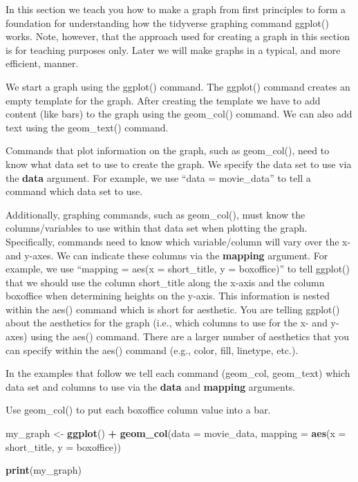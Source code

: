 \documentclass[
]{krantz}
\makeatletter
\newenvironment{Shaded}{\begin{snugshade}}{\end{snugshade}}
\newcommand{\DataTypeTok}[1]{\textcolor[rgb]{0.27,0.27,0.27}{#1}}
\newcommand{\KeywordTok}[1]{\textcolor[rgb]{0.27,0.27,0.27}{\textbf{#1}}}
\newcommand{\NormalTok}[1]{#1}
\newcommand{\OperatorTok}[1]{\textcolor[rgb]{0.43,0.43,0.43}{\textbf{#1}}}
\newcommand{\StringTok}[1]{\textcolor[rgb]{0.5,0.5,0.5}{#1}}
\newenvironment{kframe}{%
\medskip{}
\setlength{\fboxsep}{.8em}
 \def\at@end@of@kframe{}%
 \ifinner\ifhmode%
  \def\at@end@of@kframe{\end{minipage}}%
  \begin{minipage}{\columnwidth}%
 \fi\fi%
 \def\FrameCommand##1{\hskip\@totalleftmargin \hskip-\fboxsep
 \colorbox{shadecolor}{##1}\hskip-\fboxsep
     \hskip-\linewidth \hskip-\@totalleftmargin \hskip\columnwidth}%
 \MakeFramed {\advance\hsize-\width
   \@totalleftmargin\z@ \linewidth\hsize
   \@setminipage}}%
 {\par\unskip\endMakeFramed%
 \at@end@of@kframe}
\renewenvironment{Shaded}{\begin{kframe}}{\end{kframe}}
\makeatother
\begin{document}
In this section we teach you how to make a graph from first principles to form a foundation for understanding how the tidyverse graphing command ggplot() works. Note, however, that the approach used for creating a graph in this section is for teaching purposes only. Later we will make graphs in a typical, and more efficient, manner.

We start a graph using the ggplot() command. The ggplot() command creates an empty template for the graph. After creating the template we have to add content (like bars) to the graph using the geom\_col() command. We can also add text using the geom\_text() command.

Commands that plot information on the graph, such as geom\_col(), need to know what data set to use to create the graph. We specify the data set to use via the \textbf{data} argument. For example, we use ``data = movie\_data'' to tell a command which data set to use.

Additionally, graphing commands, such as geom\_col(), must know the columns/variables to use within that data set when plotting the graph. Specifically, commands need to know which variable/column will vary over the x- and y-axes. We can indicate these columns via the \textbf{mapping} argument. For example, we use ``mapping = aes(x = short\_title, y = boxoffice)'' to tell ggplot() that we should use the column short\_title along the x-axis and the column boxoffice when determining heights on the y-axis. This information is nested within the aes() command which is short for aesthetic. You are telling ggplot() about the aesthetics for the graph (i.e., which columns to use for the x- and y-axes) using the aes() command. There are a larger number of aesthetics that you can specify within the aes() command (e.g., color, fill, linetype, etc.).

In the examples that follow we tell each command (geom\_col, geom\_text) which data set and columns to use via the \textbf{data} and \textbf{mapping} arguments.

Use geom\_col() to put each boxoffice column value into a bar.

\begin{Shaded}
\begin{Highlighting}[]
\NormalTok{my_graph <-}\StringTok{ }\KeywordTok{ggplot}\NormalTok{() }\OperatorTok{+}
\StringTok{  }\KeywordTok{geom_col}\NormalTok{(}\DataTypeTok{data =}\NormalTok{ movie_data,}
           \DataTypeTok{mapping =} \KeywordTok{aes}\NormalTok{(}\DataTypeTok{x =}\NormalTok{ short_title, }
                         \DataTypeTok{y =}\NormalTok{ boxoffice))}

\KeywordTok{print}\NormalTok{(my_graph)}
\end{Highlighting}
\end{Shaded}
\end{document}
